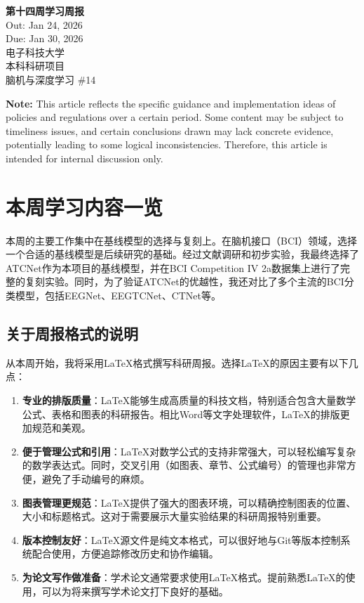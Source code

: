 \documentclass[12pt,a4paper]{ctexart}
\begin{document}
\begin{center}
    {\LARGE \textbf{第十四周学习周报}}\\[0.5cm]
    {\large Out: Jan 24, 2026}\\
    {\large Due: Jan 30, 2026}\\[0.5cm]
    {\large 电子科技大学}\\
    {\large 本科科研项目}\\
    {\large 脑机与深度学习 \#14}
\end{center}

\vspace{1cm}

\noindent \textbf{Note:} This article reflects the specific guidance and implementation ideas of policies and regulations over a certain period. Some content may be subject to timeliness issues, and certain conclusions drawn may lack concrete evidence, potentially leading to some logical inconsistencies. Therefore, this article is intended for internal discussion only.

\section{本周学习内容一览}

本周的主要工作集中在基线模型的选择与复刻上。在脑机接口（BCI）领域，选择一个合适的基线模型是后续研究的基础。经过文献调研和初步实验，我最终选择了ATCNet作为本项目的基线模型，并在BCI Competition IV 2a数据集上进行了完整的复刻实验。同时，为了验证ATCNet的优越性，我还对比了多个主流的BCI分类模型，包括EEGNet、EEGTCNet、CTNet等。

\subsection{关于周报格式的说明}

从本周开始，我将采用LaTeX格式撰写科研周报。选择LaTeX的原因主要有以下几点：

\begin{enumerate}
    \item \textbf{专业的排版质量}：LaTeX能够生成高质量的科技文档，特别适合包含大量数学公式、表格和图表的科研报告。相比Word等文字处理软件，LaTeX的排版更加规范和美观。
    
    \item \textbf{便于管理公式和引用}：LaTeX对数学公式的支持非常强大，可以轻松编写复杂的数学表达式。同时，交叉引用（如图表、章节、公式编号）的管理也非常方便，避免了手动编号的麻烦。
    
    \item \textbf{图表管理更规范}：LaTeX提供了强大的图表环境，可以精确控制图表的位置、大小和标题格式。这对于需要展示大量实验结果的科研周报特别重要。
    
    \item \textbf{版本控制友好}：LaTeX源文件是纯文本格式，可以很好地与Git等版本控制系统配合使用，方便追踪修改历史和协作编辑。
    
    \item \textbf{为论文写作做准备}：学术论文通常要求使用LaTeX格式。提前熟悉LaTeX的使用，可以为将来撰写学术论文打下良好的基础。
\end{enumerate}
\end{document}
